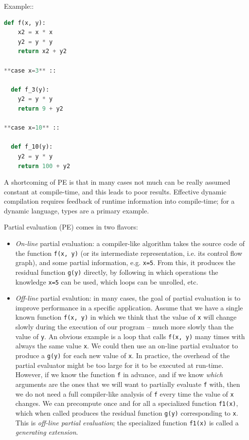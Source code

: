 
Example::
\begin{lstlisting}[language=Python]
  def f(x, y):    
    x2 = x * x    
    y2 = y * y    
    return x2 + y2

**case x=3** ::

  def f_3(y):    
    y2 = y * y   
    return 9 + y2

**case x=10** ::

  def f_10(y):    
    y2 = y * y   
    return 100 + y2
\end{lstlisting}

A shortcoming of PE is that in many cases not much can be really assumed
constant at compile-time, and this leads to poor results.  Effective dynamic
compilation requires feedback of runtime information into compile-time; for a
dynamic language, types are a primary example.

Partial evaluation (PE) comes in two flavors:

\begin{itemize}
\item \emph{On-line} partial evaluation: a compiler-like algorithm takes the
source code of the function \texttt{f(x, y)} (or its intermediate representation,
i.e. its control flow graph), and some partial
information, e.g. \texttt{x=5}.  From this, it produces the residual function
\texttt{g(y)} directly, by following in which operations the knowledge \texttt{x=5} can
be used, which loops can be unrolled, etc.

\item \emph{Off-line} partial evalution: in many cases, the goal of partial
evaluation is to improve performance in a specific application.  Assume that we
have a single known function \texttt{f(x, y)} in which we think that the value
of \texttt{x} will change slowly during the execution of our program – much
more slowly than the value of \texttt{y}.  An obvious example is a loop that
calls \texttt{f(x, y)} many times with always the same value \texttt{x}.  We
could then use an on-line partial evaluator to produce a \texttt{g(y)} for each
new value of \texttt{x}.  In practice, the overhead of the partial evaluator
might be too large for it to be executed at run-time.  However, if we know the
function \texttt{f} in advance, and if we know \emph{which} arguments are the
ones that we will want to partially evaluate \texttt{f} with, then we do not
need a full compiler-like analysis of \texttt{f} every time the value of
\texttt{x} changes.  We can precompute once and for all a specialized function
\texttt{f1(x)}, which when called produces the residual function \texttt{g(y)}
corresponding to \texttt{x}.  This is \emph{off-line partial evaluation}; the
specialized function \texttt{f1(x)} is called a \emph{generating extension}.
\end{itemize}

